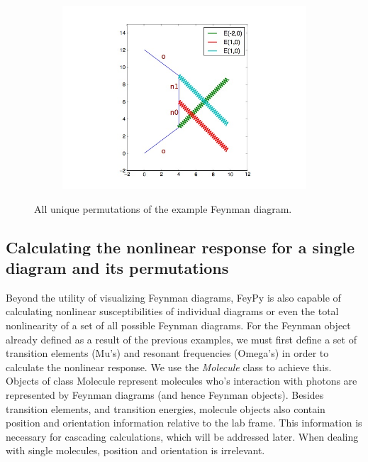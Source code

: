 \documentclass[11pt,a4paper,notitlepage]{article}
\begin{document}
\begin{figure}[htb]
\begin{subfigure}{.33\textwidth}
  \includegraphics[width=1\linewidth]{feyn_ex1c.jpg}
  \label{fig:sub3}
\end{subfigure}
\caption{All unique permutations of the example Feynman diagram.}
\label{fig:ex1_permutations}
\end{figure}

\subsection{Calculating the nonlinear response for a single diagram and its permutations}

Beyond the utility of visualizing Feynman diagrams, FeyPy is also capable of calculating nonlinear susceptibilities of individual diagrams or even the total nonlinearity of a set of all possible Feynman diagrams. For the Feynman object already defined as a result of the previous examples, we must first define a set of transition elements (Mu's) and resonant frequencies (Omega's) in order to calculate the nonlinear response. We use the \textit{Molecule} class to achieve this. Objects of class Molecule represent molecules who's interaction with photons are represented by Feynman diagrams (and hence Feynman objects). Besides transition elements, and transition energies, molecule objects also contain position and orientation information relative to the lab frame. This information is necessary for cascading calculations, which will be addressed later. When dealing with single molecules, position and orientation is irrelevant.
\end{document}
